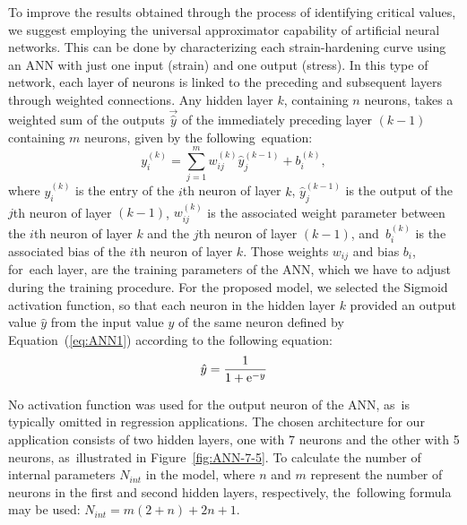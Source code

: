 \documentclass[metals,article,accept,pdftex,moreauthors]{Definitions/mdpi}
\DeclareRobustCommand{\e}[1]{{\rm e}^{#1}}
\DeclareRobustCommand{\lay}[1]{^{(#1)}}
\begin{document}
To improve the results obtained through the process of identifying critical values, we suggest employing the universal approximator capability of artificial neural networks.
\linebreak This can be done by characterizing each strain-hardening curve using an ANN with just one input (strain) and one output (stress).
In this type of network, each layer of neurons is linked to the preceding and subsequent layers through weighted connections.
Any hidden layer $k$, containing $n$ neurons, takes a weighted sum of the outputs $\overrightarrow{\hat{y}}$ of the immediately preceding layer $(k-1)$ containing $m$ neurons, given by the following~equation:
\begin{equation}
y_i\lay{k} = \sum_{j=1}^m w_{ij}\lay{k} \hat{y}_j^{(k-1)}+ b_i\lay{k},\label{eq:ANN1}
\end{equation}
where $y_i\lay{k}$ is the entry of the $i$th neuron of layer $k$, $\hat{y}_j\lay{k-1}$ is the output of the $j$th neuron of layer $(k-1)$, $w_{ij}\lay{k}$ is the associated weight parameter between the $i$th neuron of layer $k$ and the $j$th neuron of layer $(k-1)$, and~$b_i\lay{k}$ is the associated bias of the $i$th neuron of layer $k$.
Those weights $w_{ij}$ and bias $b_i$, for~each layer, are the training parameters of the ANN, which we have to adjust during the training procedure.
For the proposed model, we selected the Sigmoid activation function, so that each neuron in the hidden layer $k$ provided an output value ${\hat{y}}$ from the input value $y$ of the same neuron defined by Equation~(\ref{eq:ANN1}) according to the following equation:
\begin{equation}
\hat{y}=\frac{1}{1 + \e{-y}}\label{eq:ANN2}
\end{equation}

No activation function was used for the output neuron of the ANN, as~is typically omitted in regression applications.
The chosen architecture for our application consists of two hidden layers, one with 7 neurons and the other with 5 neurons, as~illustrated in Figure~\ref{fig:ANN-7-5}.
To calculate the number of internal parameters $N_{int}$ in the model, where $n$ and $m$ represent the number of neurons in the first and second hidden layers, respectively, the~following formula may be used: $N_{int}=m(2+n)+2n+1$.
\end{document}
